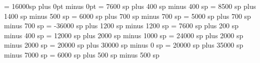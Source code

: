 %
%
%


\greadditionallineswidth = 16000sp
\grezerowidthspace=0pt plus 0pt minus 0pt
\greinterglyphspace = 7600 sp plus 400 sp minus 400 sp
\grealterationspace = 8500 sp plus 1400 sp minus 500 sp
\greclefflatspace = 6000 sp plus 700 sp minus 700 sp
\grebeforechoralsignspace = 5000 sp plus 700 sp minus 700 sp
\grebeforealterationspace = -36000 sp plus 1200 sp minus 1200 sp
\greinterelementspace = 7600 sp plus 200 sp minus 400 sp
\grelargerspace = 12000 sp plus 2000 sp minus 1000 sp
\greglyphspace = 24000 sp plus 2000 sp minus 2000 sp
\greintersyllablespace= 20000 sp plus 30000 sp minus 0 sp 
\grespacebeforecusto = 20000 sp plus 35000 sp minus 7000 sp
\grespacebeforesigns= 6000 sp plus 500 sp minus 500 sp
